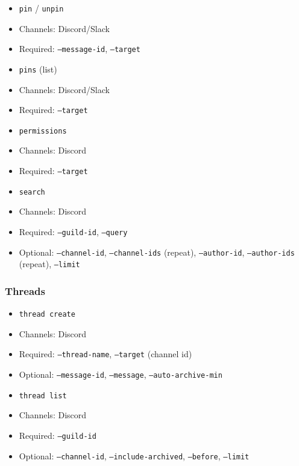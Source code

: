 \begin{itemize}
  \item \texttt{pin} / \texttt{unpin}
  \item Channels: Discord/Slack
  \item Required: \texttt{--message-id}, \texttt{--target}
\end{itemize}


\begin{itemize}
  \item \texttt{pins} (list)
  \item Channels: Discord/Slack
  \item Required: \texttt{--target}
\end{itemize}


\begin{itemize}
  \item \texttt{permissions}
  \item Channels: Discord
  \item Required: \texttt{--target}
\end{itemize}


\begin{itemize}
  \item \texttt{search}
  \item Channels: Discord
  \item Required: \texttt{--guild-id}, \texttt{--query}
  \item Optional: \texttt{--channel-id}, \texttt{--channel-ids} (repeat), \texttt{--author-id}, \texttt{--author-ids} (repeat), \texttt{--limit}
\end{itemize}


\subsubsection{Threads}


\begin{itemize}
  \item \texttt{thread create}
  \item Channels: Discord
  \item Required: \texttt{--thread-name}, \texttt{--target} (channel id)
  \item Optional: \texttt{--message-id}, \texttt{--message}, \texttt{--auto-archive-min}
\end{itemize}


\begin{itemize}
  \item \texttt{thread list}
  \item Channels: Discord
  \item Required: \texttt{--guild-id}
  \item Optional: \texttt{--channel-id}, \texttt{--include-archived}, \texttt{--before}, \texttt{--limit}
\end{itemize}


